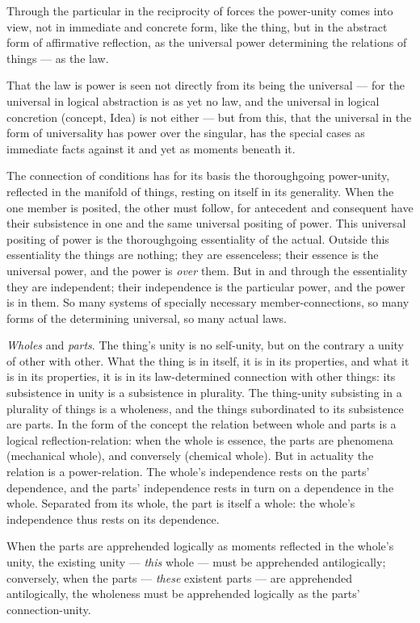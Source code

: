 \documentclass[12pt]{book}
\begin{document}
Through the particular in the reciprocity of forces the power-unity
comes into view, not in immediate and concrete form, like the thing,
but in the abstract form of affirmative reflection, as the
universal power determining the relations of things --- as the law.

That the law is power is seen not directly from its being the
universal --- for the universal in logical abstraction is as yet no
law, and the universal in logical concretion (concept, Idea) is not
either --- but from this, that the universal in the form of
universality
has power over the singular, has the special cases as immediate
facts against it and yet as moments beneath it.

The connection of conditions has for its basis the thoroughgoing
power-unity, reflected in the manifold of things, resting on itself
in its generality. When the one member is posited, the other must
follow, for antecedent and consequent have their subsistence in one
and the same universal positing of power. This universal positing of
power is the thoroughgoing essentiality of the actual. Outside this
essentiality the things are nothing; they are essenceless; their
essence is the universal power, and the power is \emph{over} them.
But in and through the essentiality they are independent; their
independence is the particular power, and the power is in them. So
many systems of specially necessary member-connections, so many
forms of the determining universal, so many actual laws.

\emph{Wholes} and \emph{parts}. The thing's unity is no self-unity,
but on the contrary a unity of other with other. What the thing is
in itself, it is in its properties, and what it is in its
properties, it is in its law-determined connection with other
things: its subsistence in unity is a subsistence in plurality. The
thing-unity subsisting in a plurality of things is a wholeness, and
the things subordinated to its subsistence are parts. In the form of
the concept the relation between whole and parts is a logical
reflection-relation: when the whole is essence, the parts are
phenomena (mechanical whole), and conversely (chemical whole). But
in actuality the relation is a power-relation. The whole's
independence rests on the parts' dependence, and the parts'
independence rests in turn on a dependence in the whole. Separated
from its whole, the part is itself a whole: the whole's independence
thus rests on its dependence.

When the parts are apprehended logically as moments reflected in the
whole's unity, the existing unity --- \emph{this} whole --- must be
apprehended antilogically; conversely, when the parts ---
\emph{these} existent parts --- are apprehended antilogically, the
wholeness must be apprehended logically as the parts'
connection-unity.
\end{document}

